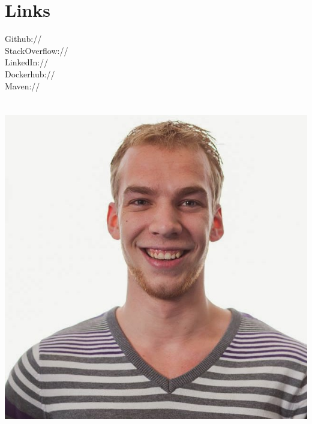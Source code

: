 \documentclass[]{deedy-resume-openfont}
\begin{document}
\begin{minipage}[t]{0.33\textwidth}

\section{Links} 
Github:// \href{https://github.com/eernie}{} \\
StackOverflow:// \href{http://stackoverflow.com/users/1956445/eernie}{}\\
LinkedIn://  \href{https://www.linkedin.com/in/erwinoldenkamp}{}\\
Dockerhub:// \href{https://hub.docker.com/u/eernie}{}\\
Maven:// \href{https://search.maven.org/#search\%7Cga\%7C1\%7Cnl.eernie}{}
\sectionsep

\section*{}
\vspace{-0.3in}
\includegraphics[width=.8\textwidth]{pasfoto}

%
%

\end{minipage} 
\hfill
\end{document}
